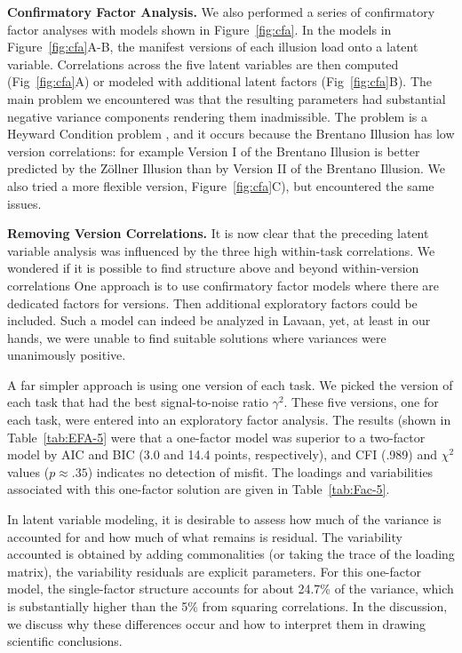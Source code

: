 \documentclass[man, 12pt]{apa7} %
\begin{document}
{\bf Confirmatory Factor Analysis.} We also performed a series of confirmatory factor analyses with models shown in Figure~\ref{fig:cfa}.  In the models in Figure~\ref{fig:cfa}A-B, the manifest versions of each illusion load onto a latent variable.  Correlations across the five latent variables are then computed (Fig~\ref{fig:cfa}A) or modeled with additional latent factors (Fig~\ref{fig:cfa}B).  The main problem we encountered was that the resulting parameters had substantial negative variance components rendering them inadmissible. The problem is a Heyward Condition problem \parencite[]{Rindskopf.1984}, and it occurs because the Brentano Illusion has low version correlations:  for example Version I of the Brentano Illusion is better predicted by the Zöllner Illusion than by Version II of the Brentano Illusion.  We also tried a more flexible version, Figure~\ref{fig:cfa}C), but encountered the same issues.


{\bf Removing Version Correlations.}  It is now clear that the preceding latent variable analysis was influenced by the three high within-task correlations.  We wondered if it is possible to find structure above and beyond within-version correlations  One approach is to use confirmatory factor models where there are dedicated factors for versions.  Then additional exploratory factors could be included.  Such a model can indeed be analyzed in Lavaan, yet, at least in our hands, we were unable to find suitable solutions where variances were unanimously positive.

A far simpler approach is using one version of each task.  We picked the version of each task that had the best signal-to-noise ratio $\gamma^2$.  These five versions, one for each task, were entered into an exploratory factor analysis.  The results (shown in Table~\ref{tab:EFA-5} were that a one-factor model was superior to a two-factor model by AIC and BIC (3.0 and 14.4 points, respectively), and CFI (.989) and $\chi^2$ values ($p\approx .35$) indicates no detection of misfit.  The loadings and variabilities associated with this one-factor solution are given in Table~\ref{tab:Fac-5}.  

In latent variable modeling, it is desirable to assess how much of the variance is accounted for and how much of what remains is residual.  The variability accounted is obtained by adding commonalities (or taking the trace of the loading matrix), the variability residuals are explicit parameters.  For this one-factor model, the single-factor structure accounts for about 24.7\% of the variance, which is substantially higher than the 5\% from squaring correlations.  In the discussion, we discuss why these differences occur and how to interpret them in drawing scientific conclusions.
\end{document}
